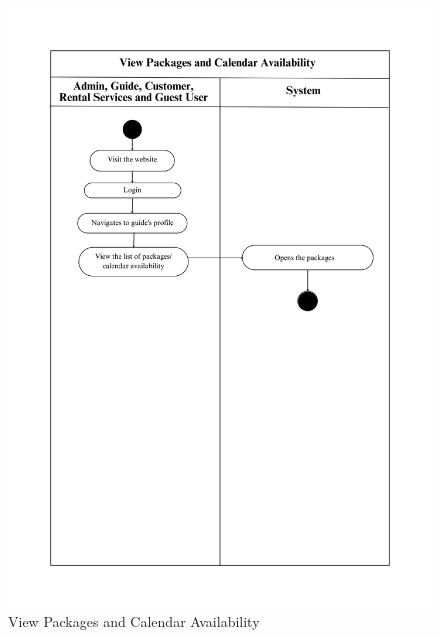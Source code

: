 \begin{figure}[h!]
    \centering
    \includegraphics[width=1\textwidth]{Images/Activity Diagrams/17 View Packages and Calendar Availability.png}
    \caption{View Packages and Calendar Availability}
    \label{fig:activity-view-packages}
\end{figure}

